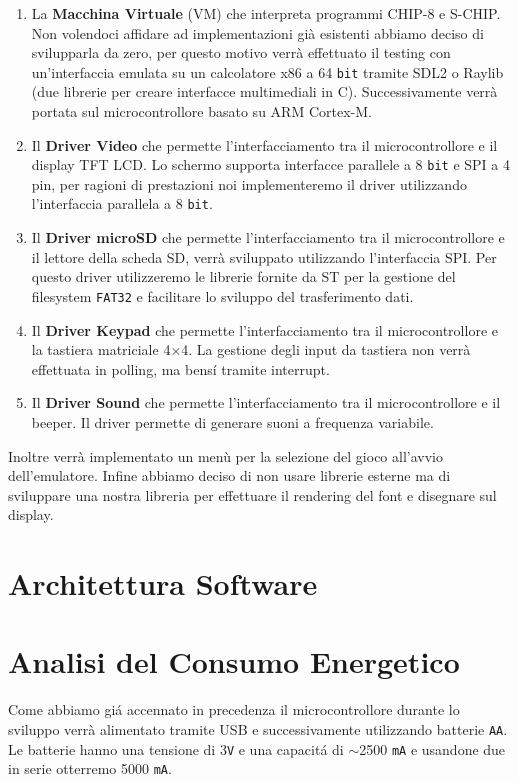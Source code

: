 \documentclass[a4paper]{article}
\begin{document}
\begin{enumerate}
	\item La \textbf{Macchina Virtuale} (VM) che interpreta programmi CHIP-8 e S-CHIP. Non volendoci affidare ad implementazioni già esistenti abbiamo deciso di svilupparla da zero, per questo motivo verrà effettuato il testing con un'interfaccia emulata su un calcolatore \textrm{x}86 a 64 \texttt{bit} tramite SDL2 o Raylib (due librerie per creare interfacce multimediali in C). Successivamente verrà portata sul microcontrollore basato su ARM Cortex-M.
	\item Il \textbf{Driver Video} che permette l'interfacciamento tra il microcontrollore e il display TFT LCD. Lo schermo supporta interfacce parallele a 8 \texttt{bit} e SPI a 4 pin, per ragioni di prestazioni noi implementeremo il driver utilizzando l'interfaccia parallela a 8 \texttt{bit}.
	\item Il \textbf{Driver microSD} che permette l'interfacciamento tra il microcontrollore e il lettore della scheda SD, verrà sviluppato utilizzando l'interfaccia SPI. Per questo driver utilizzeremo le librerie fornite da ST per la gestione del filesystem \texttt{FAT32} e facilitare lo sviluppo del trasferimento dati.
	\item Il \textbf{Driver Keypad} che permette l'interfacciamento tra il microcontrollore e la tastiera matriciale 4$\times$4. La gestione degli input da tastiera non verrà effettuata in polling, ma bens\'{i} tramite interrupt.
	\item Il \textbf{Driver Sound} che permette l'interfacciamento tra il microcontrollore e il beeper. Il driver permette di generare suoni a frequenza variabile.
\end{enumerate}

Inoltre verrà implementato un menù per la selezione del gioco all'avvio dell'emulatore. Infine abbiamo deciso di non usare librerie esterne ma di sviluppare una nostra libreria per effettuare il rendering del font e disegnare sul display.

\section{Architettura Software}

\section{Analisi del Consumo Energetico}

Come abbiamo gi\'a accennato in precedenza il microcontrollore durante lo sviluppo verrà alimentato tramite USB e successivamente utilizzando batterie \texttt{AA}. Le batterie hanno una tensione di 3\texttt{V} e una capacit\'a di $\sim$2500 \texttt{mA} e usandone due in serie otterremo 5000 \texttt{mA}.
\end{document}

